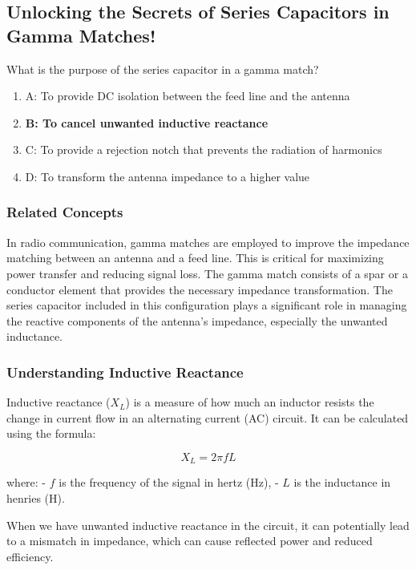 \subsection{Unlocking the Secrets of Series Capacitors in Gamma Matches!}

\begin{tcolorbox}[colback=gray!10, colframe=black, title=E9E04]
What is the purpose of the series capacitor in a gamma match? 
\begin{enumerate}[label=\Alph*)]
    \item A: To provide DC isolation between the feed line and the antenna
    \item \textbf{B: To cancel unwanted inductive reactance}
    \item C: To provide a rejection notch that prevents the radiation of harmonics
    \item D: To transform the antenna impedance to a higher value
\end{enumerate} \end{tcolorbox}

\subsubsection{Related Concepts}

In radio communication, gamma matches are employed to improve the impedance matching between an antenna and a feed line. This is critical for maximizing power transfer and reducing signal loss. The gamma match consists of a spar or a conductor element that provides the necessary impedance transformation. The series capacitor included in this configuration plays a significant role in managing the reactive components of the antenna's impedance, especially the unwanted inductance.

\subsubsection{Understanding Inductive Reactance}

Inductive reactance ($X_L$) is a measure of how much an inductor resists the change in current flow in an alternating current (AC) circuit. It can be calculated using the formula:

\[
X_L = 2 \pi f L
\]

where:
- \(f\) is the frequency of the signal in hertz (Hz),
- \(L\) is the inductance in henries (H).

When we have unwanted inductive reactance in the circuit, it can potentially lead to a mismatch in impedance, which can cause reflected power and reduced efficiency. 

